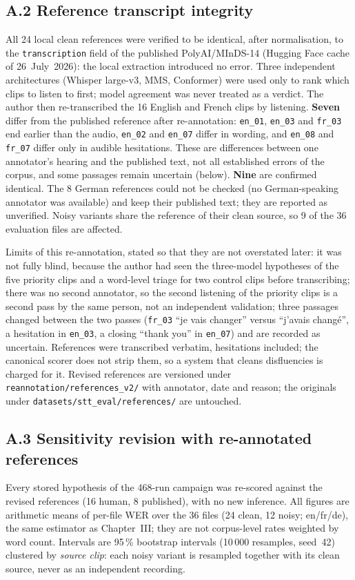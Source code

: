 \subsection*{A.2 Reference transcript integrity}
All 24 local clean references were verified to be identical, after normalisation, to the
\texttt{transcription} field of the published PolyAI/MInDS-14 (Hugging Face cache of 26~July~2026): the local
extraction introduced no error. Three independent architectures (Whisper large-v3, MMS, Conformer) were used
only to rank which clips to listen to first; model agreement was never treated as a verdict. The author then
re-transcribed the 16 English and French clips by listening. \textbf{Seven} differ from the published reference after
re-annotation: \texttt{en\_01}, \texttt{en\_03} and \texttt{fr\_03} end earlier than the audio, \texttt{en\_02} and
\texttt{en\_07} differ in wording, and \texttt{en\_08} and \texttt{fr\_07} differ only in audible hesitations. These are
differences between one annotator's hearing and the published text, not all established errors of the corpus, and some
passages remain uncertain (below). \textbf{Nine} are
confirmed identical. The 8 German references could not be checked (no German-speaking annotator was available)
and keep their published text; they are reported as unverified. Noisy variants share the reference of their clean
source, so 9 of the 36 evaluation files are affected.

Limits of this re-annotation, stated so that they are not overstated later: it was not fully blind, because the
author had seen the three-model hypotheses of the five priority clips and a word-level triage for two control
clips before transcribing; there was no second annotator, so the second listening of the priority clips is a
second pass by the same person, not an independent validation; three passages changed between the two passes
(\texttt{fr\_03} ``je vais changer'' versus ``j'avais changé'', a hesitation in \texttt{en\_03}, a closing
``thank you'' in \texttt{en\_07}) and are recorded as uncertain. References were transcribed verbatim, hesitations
included; the canonical scorer does not strip them, so a system that cleans disfluencies is charged for it.
Revised references are versioned under \texttt{reannotation/references\_v2/} with annotator, date and reason;
the originals under \texttt{datasets/stt\_eval/references/} are untouched.

\subsection*{A.3 Sensitivity revision with re-annotated references}
Every stored hypothesis of the 468-run campaign was re-scored against the revised references (16 human, 8
published), with no new inference. All figures are arithmetic means of per-file WER over the 36 files (24 clean,
12 noisy; en/fr/de), the same estimator as Chapter~III; they are not corpus-level rates weighted by word count.
Intervals are 95\,\% bootstrap intervals (10\,000 resamples, seed~42) clustered by \emph{source clip}: each
noisy variant is resampled together with its clean source, never as an independent recording.

